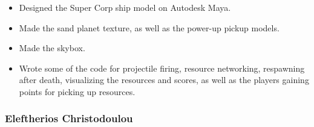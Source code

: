\documentclass[11pt,a4paper]{article}
\begin{document}
        \begin{itemize}
          \item Designed the Super Corp ship model on Autodesk Maya. 
          \item Made the sand planet texture, as well as the power-up pickup models. 
          \item Made the skybox. 
          \item Wrote some of the code for projectile firing, resource networking, respawning after death, visualizing the resources and scores, as well as the players gaining points for picking up resources.
        \end{itemize}

        \pagebreak
        \subsubsection{Eleftherios Christodoulou}
\end{document}
